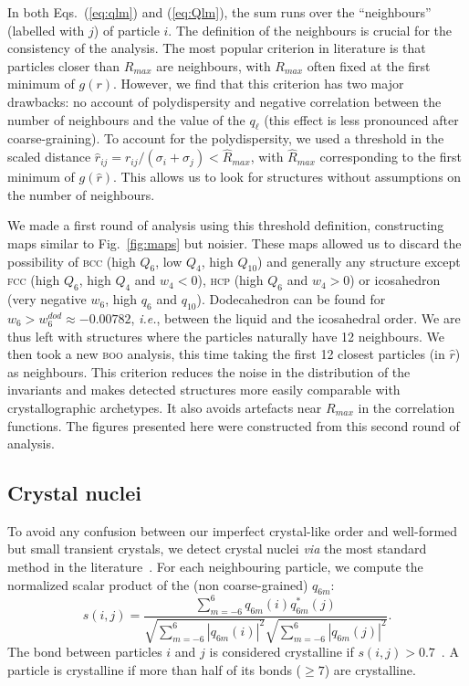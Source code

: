 In both Eqs.~(\ref{eq:qlm}) and (\ref{eq:Qlm}), the sum runs over the ``neighbours'' (labelled with $j$) of particle $i$. The definition of the neighbours is crucial for the consistency of the analysis. The most popular criterion in literature is that particles closer than $R_{max}$ are neighbours, with $R_{max}$ often fixed at the first minimum of $g(r)$. However, we find that this criterion has two major drawbacks: no account of polydispersity and negative correlation between the number of neighbours and the value of the $q_\ell$ (this effect is less pronounced after coarse-graining). To account for the polydispersity, we used a threshold in the scaled distance $\hat{r}_{i j} = r_{i j} /(\sigma_i+\sigma_j) < \hat{R}_{max}$, with $\hat{R}_{max}$ corresponding to the first minimum of $g(\hat{r})$. This allows us to look for structures without assumptions on the number of neighbours. 

We made a first round of analysis using this threshold definition, constructing maps similar to Fig.~\ref{fig:maps} but noisier. These maps allowed us to discard the possibility of \textsc{bcc} (high $Q_6$, low $Q_4$, high $Q_{10}$) and generally any structure except \textsc{fcc} (high $Q_6$, high $Q_4$ and $w_4<0$), \textsc{hcp} (high $Q_6$ and $w_4>0$) or icosahedron (very negative $w_6$, high $q_6$ and $q_{10}$). Dodecahedron can be found for $w_6>w_6^{dod}\approx -0.00782$, \emph{i.e.}, between the liquid and the icosahedral order. We are thus left with structures where the particles naturally have 12 neighbours. We then took a new \textsc{boo} analysis, this time taking the first 12 closest particles (in $\hat{r}$) as neighbours. This criterion reduces the noise in the distribution of the invariants and makes detected structures more easily comparable with crystallographic archetypes. It also avoids artefacts near $R_{max}$ in the correlation functions. The figures presented here were constructed from this second round of analysis.

\subsection*{Crystal nuclei}

To avoid any confusion between our imperfect crystal-like order and well-formed but small transient crystals, we detect crystal nuclei \emph{via} the most standard method in the literature~\cite{ReintenWolde1996, Zaccarelli2009}. For each neighbouring particle, we compute the normalized scalar product of the (non coarse-grained) $q_{6 m}$:
\begin{equation}
	s(i,j) = \frac{
		\sum_{m=-6}^{6} q_{6 m}(i) q_{6 m}^{*}(j)
	}{
		\sqrt{\sum_{m=-6}^{6} |q_{6 m}(i)|^2} \sqrt{\sum_{m=-6}^{6} |q_{6 m}(j)|^2}
	}.
	\label{eq:boo_dot_product}
\end{equation}
The bond between particles $i$ and $j$ is considered crystalline if $s(i,j)>0.7$~\cite{Zaccarelli2009}. A particle is crystalline if more than half of its bonds ($\geq 7$) are crystalline.

